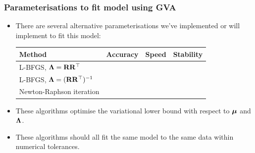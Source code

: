 \documentclass{beamer}
\begin{document}
	\begin{frame}
		\frametitle{Parameterisations to fit model using GVA}
		\begin{itemize}
			\item There are several alternative parameterisations we've implemented or will implement
			      to fit this model:
			      \begin{tabular}{|l|ccc|}
			      	\hline
			      	Method                                   & Accuracy   & Speed      & Stability  \\
			      	\hline
			      	L-BFGS, ${\boldsymbol \Lambda} = {\bf R} {\bf R}^\top$        & \checkmark &            & \checkmark \\
			      	L-BFGS, ${\boldsymbol \Lambda} = ({\bf R} {\bf R}^\top)^{-1}$ & \checkmark & \checkmark & \checkmark \\
			      	Newton-Raphson iteration                 & \checkmark & \checkmark &            \\
			      	\hline
			      \end{tabular}	
			\item These algorithms optimise the variational lower bound with respect to
			      ${\boldsymbol \mu}$ and ${\boldsymbol \Lambda}$.
			\item These algorithms should all fit the same model to the same data
			      within numerical tolerances.
		\end{itemize}
	\end{frame}
		
\end{document}
